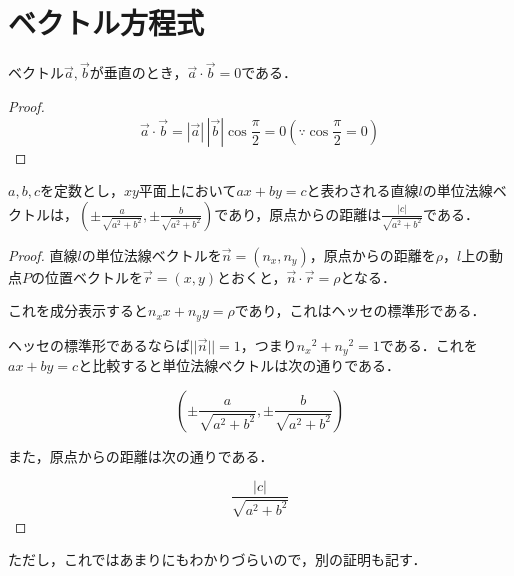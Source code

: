 \section{ベクトル方程式}

\begin{theorem}
  ベクトル$\vec a, \vec b$が垂直のとき，$\vec a \cdot \vec b = 0$である．
\end{theorem}

\begin{proof}
  \[
    \vec a \cdot \vec b = |\vec a| \, |\vec b| \cos \frac{\pi}{2} = 0 (\because \cos \frac{\pi}{2} = 0)
  \]
\end{proof}

\begin{theorem}
  $a, b, c$を定数とし，$xy$平面上において$ax + by = c$と表わされる直線$l$の単位法線ベクトルは，$\displaystyle (\pm \frac{a}{\sqrt{a^2 + b^2}}, \pm \frac{b}{\sqrt{a^2 + b^2}})$であり，原点からの距離は$\displaystyle \frac{|c|}{\sqrt{a^2 + b^2}}$である．
\end{theorem}

\begin{proof}
  直線$l$の単位法線ベクトルを$\vec n = (n_x, n_y)$，原点からの距離を$\rho$，$l$上の動点$P$の位置ベクトルを$\vec r = (x, y)$とおくと，$\vec n \cdot \vec r = \rho$となる．

  これを成分表示すると$n_x x + n_y y = \rho$であり，これはヘッセの標準形である．

  ヘッセの標準形であるならば$||\vec n|| = 1$，つまり${n_x}^2 + {n_y}^2 = 1$である．これを$ax + by = c$と比較すると単位法線ベクトルは次の通りである．

\[
  (\pm \frac{a}{\sqrt{a^2 + b^2}}, \pm \frac{b}{\sqrt{a^2 + b^2}})
\]

  また，原点からの距離は次の通りである．

\[
  \frac{|c|}{\sqrt{a^2 + b^2}}
\]

\end{proof}

ただし，これではあまりにもわかりづらいので，別の証明も記す．

